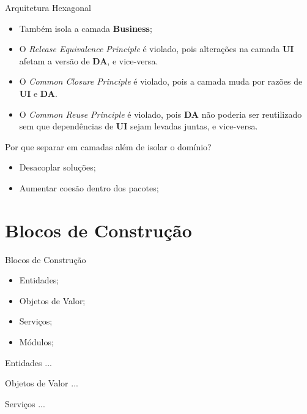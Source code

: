 \documentclass[aspectratio=169]{beamer}
\begin{document}
\begin{frame}{Arquitetura Hexagonal}			
	\begin{itemize}	
		\item Também isola a camada \textbf{Business};
		\item O \textit{Release Equivalence Principle} é violado, pois  alterações na camada \textbf{UI} afetam a versão de \textbf{DA}, e vice-versa. 
		\item O \textit{Common Closure Principle} é violado, pois a camada muda por razões de \textbf{UI} e \textbf{DA}. 
		\item O \textit{Common Reuse Principle} é violado, pois \textbf{DA} não poderia ser reutilizado sem que dependências de \textbf{UI} sejam levadas juntas, e vice-versa.
	\end{itemize}
\end{frame}

\begin{frame}{Por que separar em camadas além de isolar o domínio?}	
	\begin{itemize}	
		\item Desacoplar soluções;
		\item Aumentar coesão dentro dos pacotes;
	\end{itemize}
\end{frame}

\section{Blocos de Construção}
\begin{frame}{Blocos de Construção}	
	\begin{itemize}	
		\item Entidades;
		\item Objetos de Valor;
		\item Serviços;
		\item Módulos;
	\end{itemize}
\end{frame}

\begin{frame}{Entidades}	
	...
\end{frame}

\begin{frame}{Objetos de Valor}	
	...
\end{frame}

\begin{frame}{Serviços}	
	...
\end{frame}
\end{document}
